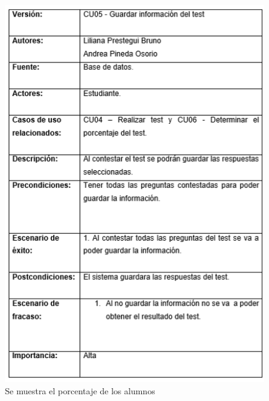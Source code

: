 \documentclass[letterpaper,oneside,openany,11pt]{book}
\begin{document}
\begin{figure}[H]
	\centering
	\includegraphics[width=1.0\textwidth]{./Imagenes/17}
	\caption{Se muestra el porcentaje de los alumnos}
\end{figure}
\end{document}
